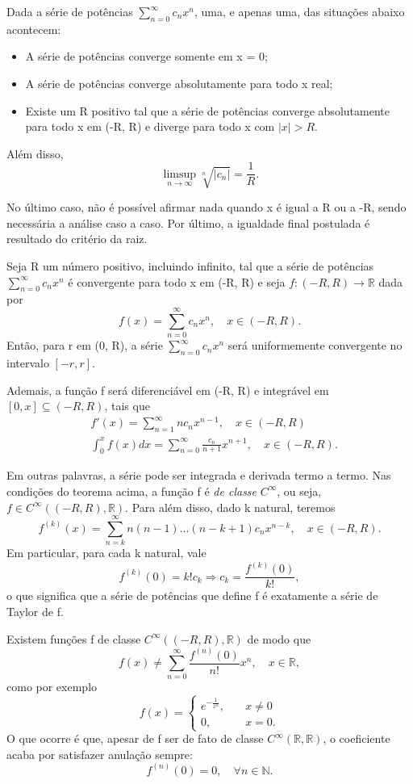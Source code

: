 \documentclass[../analysis_notes.tex]{subfiles}
\begin{document}
\begin{theorem*}
	Dada a série de potências \(\sum\limits_{n=0}^{\infty}c_{n}x^{n}\), uma, e apenas uma, das situações abaixo acontecem:
	\begin{itemize}
		\item A série de potências converge somente em x = 0;
		\item A série de potências converge absolutamente para todo x real;
		\item Existe um R positivo tal que a série de potências converge absolutamente para todo x em (-R, R) e diverge para todo x com \(|x|>R\).
	\end{itemize}
	Além disso,
	\[
		\limsup_{n\to \infty}\sqrt[n]{|c_{n}|} = \frac{1}{R}.
	\]
\end{theorem*}
No último caso, não é possível afirmar nada quando x é igual a R ou a -R, sendo necessária a análise caso a caso. Por último, a igualdade final postulada é resultado do critério da raiz.
\begin{theorem*}
	Seja R um número positivo, incluindo infinito, tal que a série de potências \(\sum\limits_{n=0}^{\infty}c_{n}x^{n}\) é convergente para todo x em (-R, R) e seja \(f:(-R, R)\rightarrow \mathbb{R}\) dada por
	\[
		f(x)=\sum\limits_{n=0}^{\infty}c_{n}x^{n},\quad x\in (-R, R).
	\]
	Então, para r em (0, R), a série \(\sum\limits_{n=0}^{\infty}c_{n}x^{n}\) será uniformemente convergente no intervalo \([-r, r]\).

	Ademais, a função f será diferenciável em (-R, R) e integrável em \([0,x]\subseteq (-R, R)\), tais que
	\begin{align*}
		 & f'(x)=\sum\limits_{n=1}^{\infty}nc_{n}x^{n-1},\quad x\in (-R, R)                            \\
		 & \int_{0}^{x}f(x)dx = \sum\limits_{n=0}^{\infty}\frac{c_{n}}{n+1}x^{n+1},\quad x\in (-R, R).
	\end{align*}
\end{theorem*}
Em outras palavras, a série pode ser integrada e derivada termo a termo. Nas condições do teorema acima, a função f é \textit{de classe }\(C^{\infty}\), ou seja, \(f\in C^{\infty}((-R, R), \mathbb{R})\). Para além disso, dado k natural, teremos
\[
	f^{(k)}(x)=\sum\limits_{n=k}^{\infty}n(n-1)\dotsc (n-k+1)c_{n}x^{n-k},\quad x\in (-R, R).
\]
Em particular, para cada k natural, vale
\[
	f^{(k)}(0)=k!c_{k} \Rightarrow c_{k}=\frac{f^{(k)}(0)}{k!},
\]
o que significa que a série de potências que define f é exatamente a série de Taylor de f.

Existem funções f de classe \(C^{\infty}((-R, R), \mathbb{R})\) de modo que
\[
	f(x)\neq \sum\limits_{n=0}^{\infty}\frac{f^{(n)}(0)}{n!}x^{n},\quad x\in \mathbb{R},
\]
como por exemplo
\[
	f(x) = \left\{\begin{array}{ll}
		e^{-\frac{1}{x^{2}}},\quad & x\neq 0 \\
		0,\quad                    & x=0.
	\end{array}\right.
\]
O que ocorre é que, apesar de f ser de fato de classe \(C^{\infty}(\mathbb{R}, \mathbb{R})\), o coeficiente acaba por satisfazer anulação sempre:
\[
	f^{(n)}(0)=0,\quad \forall n\in \mathbb{N}.
\]
\end{document}
